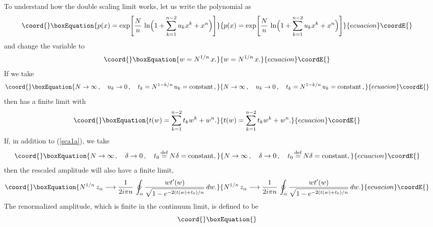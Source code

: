 \documentclass[a4paper,12pt]{article}
\begin{document}
{To understand how the double scaling limit works, let us write the 
polynomial \coordHE{} as
%
\begin{equation}\coord{}\boxEquation{
\label{plog}
p(x) = \exp \Biggl[ {N\over n}\, \ln \Bigl( 1+\sum_{k=1}^{n-2} u_{k}x^{k} + 
x^{n}\Bigr)\Biggr]
}{
p(x) = \exp \Biggl[ {N\over n}\, \ln \Bigl( 1+\sum_{k=1}^{n-2} u_{k}x^{k} + 
x^{n}\Bigr)\Biggr]
}{ecuacion}\coordE{}\end{equation}
%
and change the variable to
%
\begin{equation}\coord{}\boxEquation{
\label{wdef}
w = N^{1/n}\, x.
}{
w = N^{1/n}\, x.
}{ecuacion}\coordE{}\end{equation}
%
If we take
%
\begin{equation}\coord{}\boxEquation{
\label{sca1a}
N\rightarrow\infty\, ,\quad u_{k}\rightarrow 0\, ,\quad
t_{k} = N^{1-k/n}\,u_{k} = {\rm constant}\, ,
}{
N\rightarrow\infty\, ,\quad u_{k}\rightarrow 0\, ,\quad
t_{k} = N^{1-k/n}\,u_{k} = {\rm constant}\, ,
}{ecuacion}\coordE{}\end{equation}
%
then \coordHE{} has a finite limit \coordHE{} with
%
\begin{equation}\coord{}\boxEquation{
\label{tpoldef}
t(w) = \sum_{k=1}^{n-2}t_{k}w^{k} + w^{n}.
}{
t(w) = \sum_{k=1}^{n-2}t_{k}w^{k} + w^{n}.
}{ecuacion}\coordE{}\end{equation}
%
If, in addition to (\ref{sca1a}), we take
%
\begin{equation}\coord{}\boxEquation{
\label{sca1b}
N\rightarrow\infty\, ,\quad\delta\rightarrow 0\, ,\quad
t_{0} \mathop{=}\limits ^{\rm def} N\delta = {\rm constant},
}{
N\rightarrow\infty\, ,\quad\delta\rightarrow 0\, ,\quad
t_{0} \mathop{=}\limits ^{\rm def} N\delta = {\rm constant},
}{ecuacion}\coordE{}\end{equation}
%
then the rescaled amplitude \coordHE{} will also have a finite limit,
%
\begin{equation}\coord{}\boxEquation{
\label{zlimit}
N^{1/n}\, z_{\alpha} \longrightarrow {1\over 2i\pi n}\,\oint_{\alpha}
{\displaystyle w t'(w)\over\displaystyle\sqrt{1-e^{-2(t(w)+ t_{0})/n}}}\, 
dw.
}{
N^{1/n}\, z_{\alpha} \longrightarrow {1\over 2i\pi n}\,\oint_{\alpha}
{\displaystyle w t'(w)\over\displaystyle\sqrt{1-e^{-2(t(w)+ t_{0})/n}}}\, 
dw.
}{ecuacion}\coordE{}\end{equation}
%
The renormalized amplitude, which is finite in the continuum limit, is 
defined to be
%
\begin{equation}\coord{}\boxEquation{
}
\end{equation}}
\end{document}
